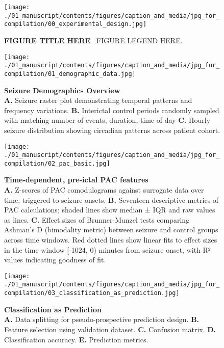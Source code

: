 
\begin{figure*}[h!]
    \centering
    \texttt{[image: ./01\_manuscript/contents/figures/caption\_and\_media/jpg\_for\_compilation/00\_experimental\_design.jpg]}
    \caption{\textbf{
FIGURE TITLE HERE
}
\smallskip
\
FIGURE LEGEND HERE.
}
    \label{fig:0_experimental_design}
\end{figure*}

\begin{figure*}[htbp]
    \centering
    \texttt{[image: ./01\_manuscript/contents/figures/caption\_and\_media/jpg\_for\_compilation/01\_demographic\_data.jpg]}
    \caption{\textbf{Seizure Demographics Overview}\\
\smallskip
\textbf{A.} Seizure raster plot demonstrating temporal patterns and frequency variations.
\textbf{B.} Interictal control periods randomly sampled with matching number of events, duration, time of day
\textbf{C.} Hourly seizure distribution showing circadian patterns across patient cohort.}
    \label{fig:1_demographic_data}
\end{figure*}

\begin{figure*}[htbp]
    \centering
    \texttt{[image: ./01\_manuscript/contents/figures/caption\_and\_media/jpg\_for\_compilation/02\_pac\_basic.jpg]}
    \caption{\textbf{Time-dependent, pre-ictal PAC features}\\
\smallskip
\textbf{A.} Z-scores of PAC comodulograms against surrogate data over time, triggered to seizure onsets.
\textbf{B.} Seventeen descriptive metrics of PAC calculations; shaded lines show median ± IQR and raw values as lines.
\textbf{C.} Effect sizes of Brunner-Munzel tests comparing Ashman's D (bimodality metric) between seizure and control groups across time windows. Red dotted lines show linear fits to effect sizes in the time window [-1024, 0) minutes from seizure onset, with R² values indicating goodness of fit.
}
    \label{fig:2_pac_basic}
\end{figure*}

\begin{figure*}[htbp]
    \centering
    \texttt{[image: ./01\_manuscript/contents/figures/caption\_and\_media/jpg\_for\_compilation/03\_classification\_as\_prediction.jpg]}
    \caption{\textbf{Classification as Prediction}\\
\smallskip
\textbf{A.} Data splitting for pseudo-prospective prediction design.
\textbf{B.} Feature selection using validation dataset.
\textbf{C.} Confusion matrix.
\textbf{D.} Classification accuracy.
\textbf{E.} Prediction metrics.
}
    \label{fig:3_classification_as_prediction}
\end{figure*}

